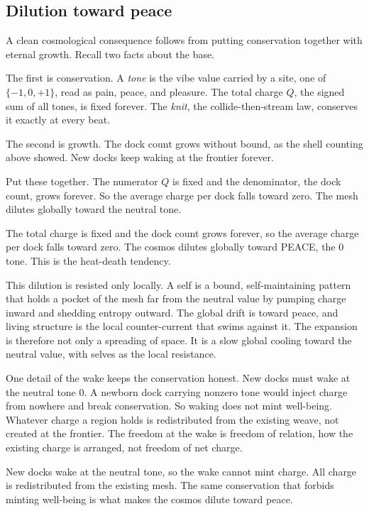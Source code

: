 \subsection{Dilution toward peace}

A clean cosmological consequence follows from putting conservation together with eternal growth. Recall two facts about the base.

The first is conservation. A \emph{tone} is the vibe value carried by a site, one of $\{-1, 0, +1\}$, read as pain, peace, and pleasure. The total charge $Q$, the signed sum of all tones, is fixed forever. The \emph{knit}, the collide-then-stream law, conserves it exactly at every beat.

The second is growth. The dock count grows without bound, as the shell counting above showed. New docks keep waking at the frontier forever.

Put these together. The numerator $Q$ is fixed and the denominator, the dock count, grows forever. So the average charge per dock falls toward zero. The mesh dilutes globally toward the neutral tone.

\begin{principle}
The total charge is fixed and the dock count grows forever, so the average charge per dock falls toward zero. The cosmos dilutes globally toward PEACE, the $0$ tone. This is the heat-death tendency.
\end{principle}

This dilution is resisted only locally. A self is a bound, self-maintaining pattern that holds a pocket of the mesh far from the neutral value by pumping charge inward and shedding entropy outward. The global drift is toward peace, and living structure is the local counter-current that swims against it. The expansion is therefore not only a spreading of space. It is a slow global cooling toward the neutral value, with selves as the local resistance.

One detail of the wake keeps the conservation honest. New docks must wake at the neutral tone $0$. A newborn dock carrying nonzero tone would inject charge from nowhere and break conservation. So waking does not mint well-being. Whatever charge a region holds is redistributed from the existing weave, not created at the frontier. The freedom at the wake is freedom of relation, how the existing charge is arranged, not freedom of net charge.

\begin{proposition}
New docks wake at the neutral tone, so the wake cannot mint charge. All charge is redistributed from the existing mesh. The same conservation that forbids minting well-being is what makes the cosmos dilute toward peace.
\end{proposition}


